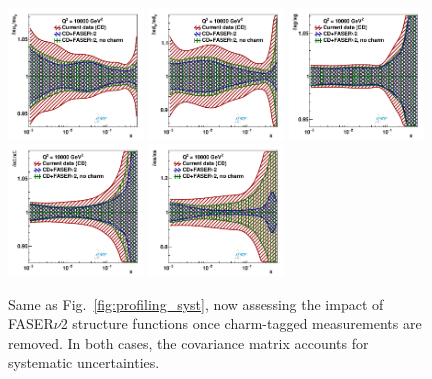 \begin{figure}[t]
\centering
\includegraphics[width=0.32\textwidth]{plots/proton_fasernu2/inclusive-only_vs_inclusive+charm/statOnly_FASERv2_q2_10000_pdf_uv_ratio.pdf}
\includegraphics[width=0.32\textwidth]{plots/proton_fasernu2/inclusive-only_vs_inclusive+charm/statOnly_FASERv2_q2_10000_pdf_dv_ratio.pdf}
\includegraphics[width=0.32\textwidth]{plots/proton_fasernu2/inclusive-only_vs_inclusive+charm/statOnly_FASERv2_q2_10000_pdf_g_ratio.pdf}\\
\includegraphics[width=0.32\textwidth]{plots/proton_fasernu2/inclusive-only_vs_inclusive+charm/statOnly_FASERv2_q2_10000_pdf_Sea_ratio.pdf}
\includegraphics[width=0.32\textwidth]{plots/proton_fasernu2/inclusive-only_vs_inclusive+charm/statOnly_FASERv2_q2_10000_pdf_s_ratio.pdf}
\caption{Same as Fig.~\ref{fig:profiling_syst}, now assessing the impact of FASER$\nu$2 structure functions
once charm-tagged measurements are removed.
%
In both cases, the covariance matrix accounts for systematic uncertainties.
}
\label{fig:profiling_charm}
\end{figure}
